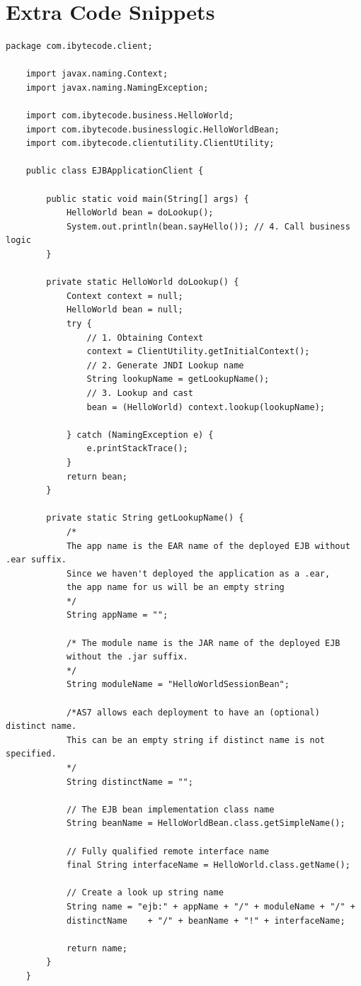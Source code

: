 \documentclass[a4paper,10pt]{scrreprt}
\begin{document}
\chapter{Extra Code Snippets}
\begin{lstlisting}[caption=JNDI Lookup Helper]
	package com.ibytecode.client;

	import javax.naming.Context;
	import javax.naming.NamingException;

	import com.ibytecode.business.HelloWorld;
	import com.ibytecode.businesslogic.HelloWorldBean;
	import com.ibytecode.clientutility.ClientUtility;

	public class EJBApplicationClient {

		public static void main(String[] args) {
			HelloWorld bean = doLookup();
			System.out.println(bean.sayHello()); // 4. Call business logic
		}

		private static HelloWorld doLookup() {
			Context context = null;
			HelloWorld bean = null;
			try {
				// 1. Obtaining Context
				context = ClientUtility.getInitialContext();
				// 2. Generate JNDI Lookup name
				String lookupName = getLookupName();
				// 3. Lookup and cast
				bean = (HelloWorld) context.lookup(lookupName);

			} catch (NamingException e) {
				e.printStackTrace();
			}
			return bean;
		}

		private static String getLookupName() {
			/*
			The app name is the EAR name of the deployed EJB without .ear suffix.
			Since we haven't deployed the application as a .ear,
			the app name for us will be an empty string
			*/
			String appName = "";

			/* The module name is the JAR name of the deployed EJB
			without the .jar suffix.
			*/
			String moduleName = "HelloWorldSessionBean";

			/*AS7 allows each deployment to have an (optional) distinct name.
			This can be an empty string if distinct name is not specified.
			*/
			String distinctName = "";

			// The EJB bean implementation class name
			String beanName = HelloWorldBean.class.getSimpleName();

			// Fully qualified remote interface name
			final String interfaceName = HelloWorld.class.getName();

			// Create a look up string name
			String name = "ejb:" + appName + "/" + moduleName + "/" +
			distinctName    + "/" + beanName + "!" + interfaceName;

			return name;
		}
	}
\end{lstlisting}
\end{document}
